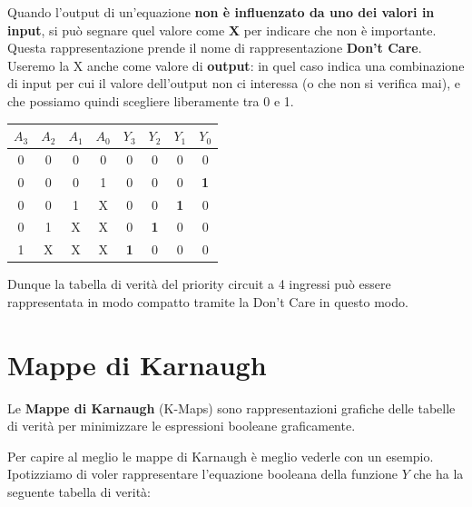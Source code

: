 \documentclass[11pt, a4paper, titlepage, oneside]{scrbook}
\begin{document}
\begin{Definizione}
\label{def-dont-care}
Quando l'output di un'equazione \textbf{non è influenzato da uno dei valori in input}, si può segnare quel valore come \textbf{X} per indicare che non è importante. Questa rappresentazione prende il nome di rappresentazione \textbf{Don't Care}. Useremo la X anche come valore di \textbf{output}: in quel caso indica una combinazione di input per cui il valore dell'output non ci interessa (o che non si verifica mai), e che possiamo quindi scegliere liberamente tra 0 e 1.
\end{Definizione}
\begin{minipage}[c]{0.50\textwidth}
\centering
\begin{center}
\begin{tabular}{cccc|cccc}
$A_3$ & $A_2$ & $A_1$ & $A_0$ & $Y_3$ & $Y_2$ & $Y_1$ & $Y_0$ \\
\hline
0 & 0 & 0 & 0 & 0 & 0 & 0 & 0 \\
0 & 0 & 0 & 1 & 0 & 0 & 0 & \textbf{1} \\
0 & 0 & 1 & X & 0 & 0 & \textbf{1} & 0 \\
0 & 1 & X & X & 0 & \textbf{1} & 0 & 0 \\
1 & X & X & X & \textbf{1} & 0 & 0 & 0 \\
\end{tabular}
\end{center}
\end{minipage}\hfill
\begin{minipage}[c]{0.45\textwidth}
Dunque la tabella di verità del priority circuit a 4 ingressi può essere rappresentata in modo compatto tramite la Don't Care in questo modo.
\end{minipage}


\section{Mappe di Karnaugh}

\begin{Definizione}
\label{def-mappe-karnaugh}
Le \textbf{Mappe di Karnaugh} (K-Maps) sono rappresentazioni grafiche delle tabelle di verità per minimizzare le espressioni booleane graficamente.
\end{Definizione}

Per capire al meglio le mappe di Karnaugh è meglio vederle con un esempio. Ipotizziamo di voler rappresentare l'equazione booleana della funzione $Y$ che ha la seguente tabella di verità:
\end{document}
